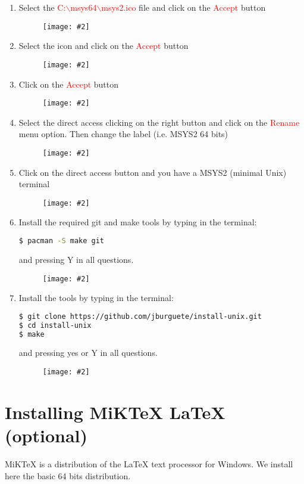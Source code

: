 \documentclass[a4paper]{article}
\newcommand{\FIG}[2]
{
	\begin{figure}[ht!]
	\centering
	\texttt{[image: \#2]}
	\end{figure}
}
\newcommand{\FIGURE}[1]{\FIG{0.35}{#1}}
\newcommand{\RED}[1] {\textcolor{red}{#1}}
\begin{document}
\begin{enumerate}
\item Select the \RED{C:$\backslash$msys64$\backslash$msys2.ico} file and click
on the \RED{Accept} button
\FIGURE{MSYS2-16.png.eps}

\clearpage

\item Select the icon and click on the \RED{Accept} button
\FIGURE{MSYS2-17.png.eps}

\item Click on the \RED{Accept} button
\FIGURE{MSYS2-18.png.eps}

\clearpage

\item Select the direct access clicking on the right button and click on the
\RED{Rename} menu option. Then change the label (i.e. MSYS2 64 bits)
\FIGURE{MSYS2-19.png.eps}

\item Click on the direct access button and you have a MSYS2 (minimal Unix)
terminal
\FIGURE{MSYS2-21.png.eps}

\clearpage

\item Install the required git and make tools by typing in the terminal:
\begin{lstlisting}[language=bash,basicstyle=\scriptsize]
$ pacman -S make git
\end{lstlisting}
and pressing Y in all questions.
\FIGURE{MSYS2-23.png.eps}

\item Install the tools by typing in the terminal:
\begin{lstlisting}[language=bash,basicstyle=\scriptsize]
$ git clone https://github.com/jburguete/install-unix.git
$ cd install-unix
$ make
\end{lstlisting}
and pressing yes or Y in all questions.
\FIGURE{MSYS2-24.png.eps}

\end{enumerate}

\clearpage

\section{Installing MiKTeX LaTeX (optional)}

MiKTeX is a distribution of the LaTeX text processor for Windows. We install
here the basic 64 bits distribution.
\end{document}
